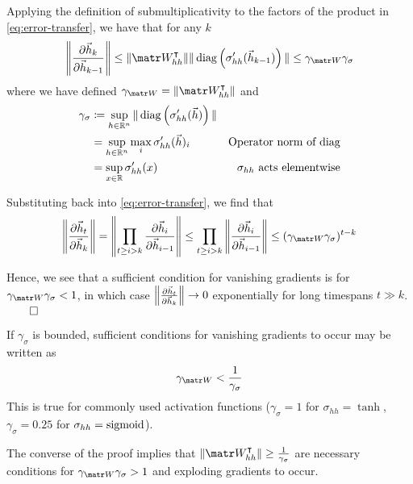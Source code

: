 Applying the definition of submultiplicativity to the factors of
the product in \cref{eq:error-transfer}, we have that for any $k$
\begin{equation}
    \left\| \frac{\pd \h_k}{\pd \h_{k-1}} \right\|
    \leq \| \W_{hh}^\tp \| \| \diag\left( \sigma_{hh}'(\h_{k-1}) \right) \|
    \leq \gamma_{\W} \gamma_\sigma
\end{equation}
where we have defined $\gamma_{\W} = \| \W_{hh}^\tp \|$ and
\begin{align}
    \gamma_\sigma
    &\coloneqq \sup_{h \in \mathbb{R}^n} \| \operatorname*{diag} \left( \sigma_{hh}'(\vec{h}) \right) \|  &\\
    &= \sup_{h \in \mathbb{R}^n} \max_i \sigma_{hh}'(\vec{h})_i &\mbox{Operator norm of diag} \\
    &= \sup_{x \in \mathbb{R}} \sigma_{hh}'(x) &\mbox{$\sigma_{hh}$ acts elementwise}
\end{align}

Substituting back into \cref{eq:error-transfer}, we find that
\begin{equation}
    \left\| \frac{\pd \h_t}{\pd \h_k} \right\|
    = \left\| \prod_{t \geq i > k} \frac{\pd \h_i}{\pd \h_{i-1}} \right\|
    \leq  \prod_{t \geq i > k} \left\| \frac{\pd \h_i}{\pd \h_{i-1}} \right\|
    \leq (\gamma_{\W} \gamma_\sigma)^{t-k}
\end{equation}

Hence, we see that a sufficient condition for vanishing gradients is
for $\gamma_{\W} \gamma_\sigma < 1$, in which case $\left\| \frac{\partial \vec{h}_t}{\partial \vec{h}_k} \right\| \to 0$
exponentially for long timespans $t \gg k$. $\qed$

If $\gamma_\sigma$ is bounded, sufficient
conditions for vanishing gradients to occur may be written as
\begin{equation}
    \gamma_{\W} < \frac{1}{\gamma_\sigma}
\end{equation}
This is true for commonly used activation functions (\eg $\gamma_\sigma = 1$
for $\sigma_{hh} = \tanh$, $\gamma_\sigma = 0.25$ for $\sigma_{hh} =
\operatorname*{sigmoid}$).

The converse of the proof implies that $\| \W_{hh}^\tp \| \geq
\frac{1}{\gamma_\sigma}$ are necessary conditions for $\gamma_{\W}
\gamma_\sigma > 1$ and exploding gradients to occur.

